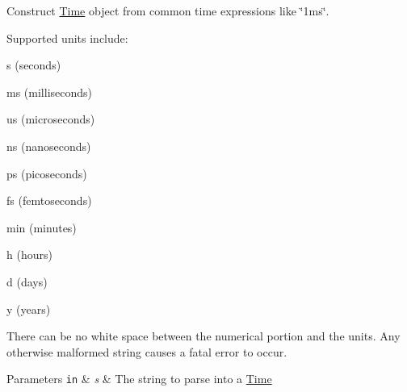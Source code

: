 Construct \hyperlink{classns3_1_1Time}{Time} object from common time expressions like \char`\"{}1ms\char`\"{}. 

Supported units include\+:
\begin{DoxyItemize}
\item {\ttfamily s} (seconds)
\item {\ttfamily ms} (milliseconds)
\item {\ttfamily us} (microseconds)
\item {\ttfamily ns} (nanoseconds)
\item {\ttfamily ps} (picoseconds)
\item {\ttfamily fs} (femtoseconds)
\item {\ttfamily min} (minutes)
\item {\ttfamily h} (hours)
\item {\ttfamily d} (days)
\item {\ttfamily y} (years)
\end{DoxyItemize}

There can be no white space between the numerical portion and the units. Any otherwise malformed string causes a fatal error to occur. 
\begin{DoxyParams}[1]{Parameters}
\mbox{\tt in}  & {\em s} & The string to parse into a \hyperlink{classns3_1_1Time}{Time} \\
\hline
\end{DoxyParams}

